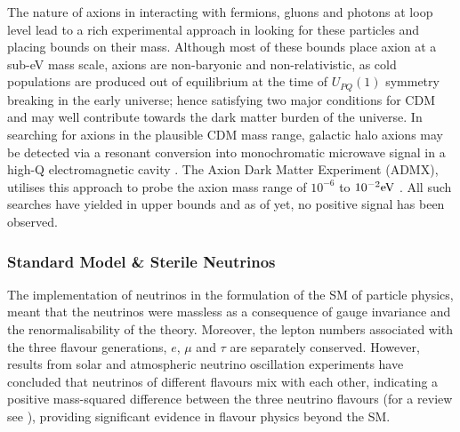The nature of axions in interacting with fermions, gluons and photons at loop level lead to a rich experimental approach in looking for these particles and placing bounds on their mass. Although most of these bounds place axion at a sub-eV mass scale, axions are non-baryonic and non-relativistic, as cold populations are produced out of equilibrium at the time of $U_{PQ}(1)$ symmetry breaking in the early universe; hence satisfying two major conditions for CDM and may well contribute towards the dark matter burden of the universe. In searching for axions in the plausible CDM mass range, galactic halo axions may be detected via a resonant conversion into monochromatic microwave signal in a high-Q electromagnetic cavity \cite{axion_searches}. The Axion Dark Matter Experiment (ADMX), utilises this approach to probe the axion mass range of $10^{-6}$ to $10^{-2} \text{eV}$ \cite{ADMX_2010}. All such searches have yielded in upper bounds and as of yet, no positive signal has been observed.


\subsubsection{Standard Model \& Sterile Neutrinos}
\label{subsubsec:neutrinos}

The implementation of neutrinos in the formulation of the SM of particle physics, meant that the neutrinos were massless as a consequence of gauge invariance and the renormalisability of the theory. Moreover, the lepton numbers associated with the three flavour generations, $e$, $\mu$ and $\tau$ are separately conserved. However, results from solar and atmospheric neutrino oscillation experiments have concluded that neutrinos of different flavours mix with each other, indicating a positive mass-squared difference between the three neutrino flavours (for a review see \cite{aless2006neutrino}), providing significant evidence in flavour physics beyond the SM.

